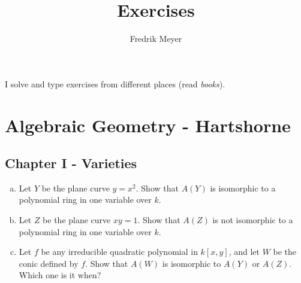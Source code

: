 \documentclass[11pt, english]{article}
\begin{document}
\title{Exercises}
\author{Fredrik Meyer}
\maketitle 

I solve and type exercises from different places (read \emph{books}). 

\section{Algebraic Geometry - Hartshorne}

\subsection{Chapter I - Varieties}

\begin{exc}[Exercise 1.1]
  \begin{enumerate}[a)]
  \item Let $Y$ be the plane curve $y=x^2$. Show that $A(Y)$ is isomorphic to a polynomial ring in one variable over $k$.
\item Let $Z$ be the plane curve $xy=1$. Show that $A(Z)$ is not isomorphic to a polynomial ring in one variable over $k$.
\item Let $f$ be any irreducible quadratic polynomial in $k[x,y]$, and let $W$ be the conic defined by $f$. Show that $A(W)$ is isomorphic to $A(Y)$ or $A(Z)$. Which one is it when?
  \end{enumerate}
\end{exc}
\end{document}

